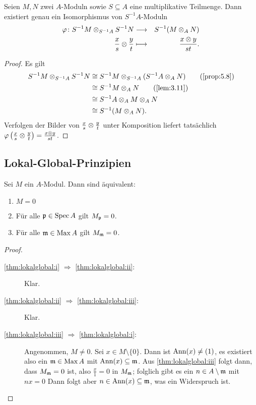 \documentclass[12pt,a4paper]{scrartcl}
\theoremstyle{cplain}
\theoremstyle{cdef}
\begin{document}
\begin{satz}
	Seien $M,N$ zwei $A$-Moduln sowie $S\subseteq A$ eine multiplikative Teilmenge. Dann existiert genau ein Isomorphismus von $S^{-1}A$-Moduln
	\begin{eqnarray*}
		\varphi\colon S^{-1}M\otimes_{S^{-1}A}S^{-1}N &\longrightarrow& S^{-1}(M\otimes_AN) \\
		\frac xs\otimes \frac yt &\longmapsto& \frac{x\otimes y}{st}.
	\end{eqnarray*}
\end{satz}
\begin{proof}
	Es gilt
	\begin{align*}
		S^{-1}M\tp_{S^{-1}A}S^{-1}N &\cong S^{-1}M \tp_{S^{-1}A}(S^{-1}A\tp_AN) \tag{\cref{prop:5.8}} \\
		&\cong S^{-1}M\tp_A N \tag{\cref{lem:3.11}} \\
		&\cong S^{-1}A\tp_AM\tp_AN \\ 
		&\cong S^{-1}(M\tp_AN).
	\end{align*}
	Verfolgen der Bilder von $\frac xs\otimes \frac yt$ unter Komposition liefert tatsächlich $\varphi\left(\frac xs\otimes \frac yt\right) = \frac{x\otimes y}{st}$.
\end{proof}

\subsection{Lokal-Global-Prinzipien}
\begin{satz} \label{thm:lokalglobal}
	Sei $M$ ein $A$-Modul. Dann sind äquivalent:
	\begin{enumerate}
		\item $M = 0$ \label{thm:lokalglobal:i}
		\item Für alle $\mathfrak{p}\in \operatorname{Spec} A$ gilt $M_{\mathfrak{p}} = 0$. \label{thm:lokalglobal:ii}
		\item Für alle $\mathfrak{m}\in\operatorname{Max} A$ gilt $M_{\mathfrak{m}} = 0$. \label{thm:lokalglobal:iii}
	\end{enumerate}
\end{satz}
\begin{proof}
	\leavevmode
	\begin{description}
		\item[\ref{thm:lokalglobal:i} $\Rightarrow$ \ref{thm:lokalglobal:ii}:] Klar.
		\item[\ref{thm:lokalglobal:ii} $\Rightarrow$ \ref{thm:lokalglobal:iii}:] Klar.
		\item[\ref{thm:lokalglobal:iii} $\Rightarrow$ \ref{thm:lokalglobal:i}:] Angenommen, $M \neq 0$. Sei $x\in M\setminus \{0\}$. Dann ist $\operatorname{Ann}(x) \neq (1)$, es existiert also ein $\mathfrak{m}\in \operatorname{Max} A$ mit $\operatorname{Ann}(x)\subseteq \mathfrak{m}$. Aus \ref{thm:lokalglobal:iii} folgt dann, dass $M_{\mathfrak{m}} = 0$ ist, also $\frac x1 = 0$ in $M_{\mathfrak{m}}$; folglich gibt es ein $n\in A\setminus \mathfrak{m}$ mit $ nx = 0$ Dann folgt aber $n\in \operatorname{Ann}(x)\subseteq \mathfrak{m}$, was ein Widerspruch ist.
		\qedhere
	\end{description}
\end{proof}
\end{document}
